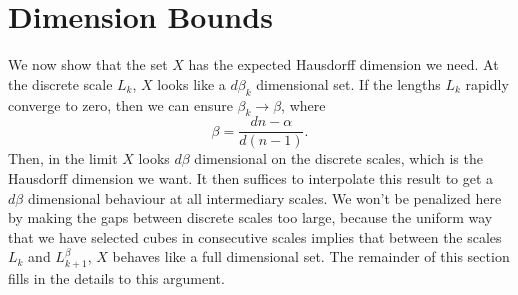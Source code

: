 \documentclass{article}
\theoremstyle{plain}
\theoremstyle{plain}
\begin{document}



%
%

\section{Dimension Bounds}

We now show that the set $X$ has the expected Hausdorff dimension we need. At the discrete scale $L_k$, $X$ looks like a $d \beta_k$ dimensional set. If the lengths $L_k$ rapidly converge to zero, then we can ensure $\beta_k \to \beta$, where
%
\[ \beta = \frac{dn - \alpha}{d(n - 1)}. \]
%
Then, in the limit $X$ looks $d \beta$ dimensional on the discrete scales, which is the Hausdorff dimension we want. It then suffices to interpolate this result to get a $d\beta$ dimensional behaviour at all intermediary scales. We won't be penalized here by making the gaps between discrete scales too large, because the uniform way that we have selected cubes in consecutive scales implies that between the scales $L_k$ and $L_{k+1}^\beta$, $X$ behaves like a full dimensional set. The remainder of this section fills in the details to this argument.
\end{document}
